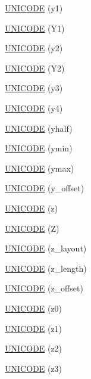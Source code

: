 \begin{DoxyCompactItemize}
\item 
\hyperlink{namespace_d_d4hep_1_1_x_m_l_adc3e04d8702fbc0e539aefca45f8d25e}{UNICODE} (y1)
\item 
\hyperlink{namespace_d_d4hep_1_1_x_m_l_abb90d77619fbcc7b007c2ba4eb880901}{UNICODE} (Y1)
\item 
\hyperlink{namespace_d_d4hep_1_1_x_m_l_a9a52e9278c042d97043f39405e2f8856}{UNICODE} (y2)
\item 
\hyperlink{namespace_d_d4hep_1_1_x_m_l_ac38f0922c409f4c951b61be728afcd76}{UNICODE} (Y2)
\item 
\hyperlink{namespace_d_d4hep_1_1_x_m_l_a7553d14786ca58dc8d3808d58b4b9d1e}{UNICODE} (y3)
\item 
\hyperlink{namespace_d_d4hep_1_1_x_m_l_acc52207a654555df1bf56b57ae1dac04}{UNICODE} (y4)
\item 
\hyperlink{namespace_d_d4hep_1_1_x_m_l_acd2e145baa81b0faaa8379b73e89f0e3}{UNICODE} (yhalf)
\item 
\hyperlink{namespace_d_d4hep_1_1_x_m_l_a20bfed5dc1ebe5c2b088e298a663d97e}{UNICODE} (ymin)
\item 
\hyperlink{namespace_d_d4hep_1_1_x_m_l_aa075a0d97bc89422b793a87d6797ba9e}{UNICODE} (ymax)
\item 
\hyperlink{namespace_d_d4hep_1_1_x_m_l_a301a704717b014240f7a792e65a25aed}{UNICODE} (y\_\-offset)
\item 
\hyperlink{namespace_d_d4hep_1_1_x_m_l_aae2d7ef12f59069a4f8c61f800e225ff}{UNICODE} (z)
\item 
\hyperlink{namespace_d_d4hep_1_1_x_m_l_a9c6795e42f487021c01c19637babff41}{UNICODE} (Z)
\item 
\hyperlink{namespace_d_d4hep_1_1_x_m_l_a3ad292dcd8d8772183098d6141839153}{UNICODE} (z\_\-layout)
\item 
\hyperlink{namespace_d_d4hep_1_1_x_m_l_a746b77c96a129664a7dbf99e468ef246}{UNICODE} (z\_\-length)
\item 
\hyperlink{namespace_d_d4hep_1_1_x_m_l_a5a0ddae8eb42012cfcf04520c45d02c7}{UNICODE} (z\_\-offset)
\item 
\hyperlink{namespace_d_d4hep_1_1_x_m_l_a285a55549152ad04edda671761f2c5ce}{UNICODE} (z0)
\item 
\hyperlink{namespace_d_d4hep_1_1_x_m_l_a080240f1e1ee9f401d7fb85da8c0dcc6}{UNICODE} (z1)
\item 
\hyperlink{namespace_d_d4hep_1_1_x_m_l_a015e22210ce38aceb39af52bd5ddee06}{UNICODE} (z2)
\item 
\hyperlink{namespace_d_d4hep_1_1_x_m_l_a193857799012cce2cfbd5e46172a02e2}{UNICODE} (z3)

\end{DoxyCompactItemize}
